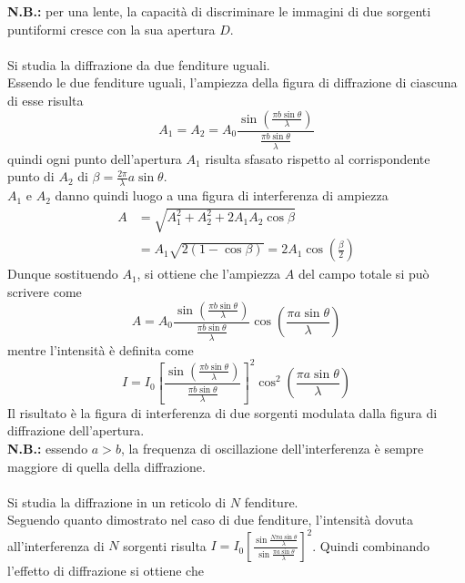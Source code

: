\documentclass{article}
\begin{document}
\textbf{N.B.:} per una lente, la capacità di discriminare le immagini di due sorgenti puntiformi cresce con la sua apertura $D$.\\
\\
Si studia la diffrazione da due fenditure uguali.\\
Essendo le due fenditure uguali, l'ampiezza della figura di diffrazione di ciascuna di esse risulta
\begin{equation}
    A_1=A_2=A_0\frac{\sin\left(\frac{\pi b\sin\theta}{\lambda}\right)}{\frac{\pi b\sin\theta}{\lambda}}
    \nonumber
\end{equation}
quindi ogni punto dell’apertura $A_1$ risulta sfasato rispetto al corrispondente punto di $A_2$ di $\beta=\frac{2\pi}{\lambda}a\sin\theta$.\\
$A_1$ e $A_2$ danno quindi luogo a una figura di interferenza di ampiezza 
\begin{equation}
\begin{split}
    A&=\sqrt{A_1^2+A_2^2+2A_1A_2\cos\beta}\\
    &=A_1\sqrt{2(1-\cos\beta)}=2A_1\cos\left(\frac{\beta}{2}\right)
    \nonumber
\end{split}
\end{equation}
Dunque sostituendo $A_1$, si ottiene che l'ampiezza $A$ del campo totale si può scrivere come
\begin{equation}
    A=A_0\frac{\sin\left(\frac{\pi b\sin\theta}{\lambda}\right)}{\frac{\pi b\sin\theta}{\lambda}}\cos\left(\frac{\pi a\sin\theta}{\lambda}\right)
    \nonumber
\end{equation}
mentre l'intensità è definita come
\begin{equation}
    I=I_0\left[\frac{\sin\left(\frac{\pi b\sin\theta}{\lambda}\right)}{\frac{\pi b\sin\theta}{\lambda}}\right]^2\cos^2\left(\frac{\pi a\sin\theta}{\lambda}\right)
    \nonumber
\end{equation}
Il risultato è la figura di interferenza di due sorgenti modulata dalla figura di diffrazione dell'apertura.\\
\textbf{N.B.:} essendo $a > b$, la frequenza di oscillazione dell'interferenza è sempre maggiore di quella della diffrazione.\\
\\
Si studia la diffrazione in un reticolo di $N$ fenditure.\\
Seguendo quanto dimostrato nel caso di due fenditure, l'intensità dovuta all'interferenza di $N$ sorgenti risulta  $I=I_0\left[\frac{\sin\frac{N\pi a\sin\theta}{\lambda}}{\sin\frac{\pi a\sin\theta}{\lambda}}\right]^2$. Quindi combinando l'effetto di diffrazione si ottiene che
\end{document}
